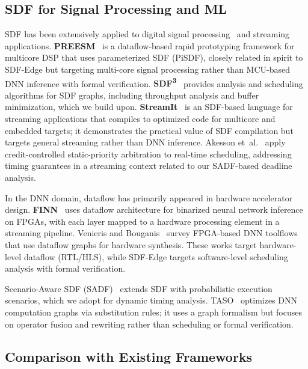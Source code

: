 \documentclass[journal]{IEEEtran}
\begin{document}
\subsection{SDF for Signal Processing and ML}

SDF has been extensively applied to digital signal processing~\cite{bhattacharyya1996software,stuijk2006sdf3} and streaming applications.
\textbf{PREESM}~\cite{pelcat2014preesm} is a dataflow-based rapid prototyping framework for multicore DSP that uses parameterized SDF (PiSDF), closely related in spirit to SDF-Edge but targeting multi-core signal processing rather than MCU-based DNN inference with formal verification.
\textbf{SDF\textsuperscript{3}}~\cite{stuijk2006sdf3} provides analysis and scheduling algorithms for SDF graphs, including throughput analysis and buffer minimization, which we build upon.
\textbf{StreamIt}~\cite{thies2002streamit} is an SDF-based language for streaming applications that compiles to optimized code for multicore and embedded targets; it demonstrates the practical value of SDF compilation but targets general streaming rather than DNN inference.
Akesson et~al.~\cite{siyoum2014resource} apply credit-controlled static-priority arbitration to real-time scheduling, addressing timing guarantees in a streaming context related to our SADF-based deadline analysis.

In the DNN domain, dataflow has primarily appeared in hardware accelerator design.
\textbf{FINN}~\cite{blott2018finn} uses dataflow architecture for binarized neural network inference on FPGAs, with each layer mapped to a hardware processing element in a streaming pipeline.
Venieris and Bouganis~\cite{venieris2018toolflows} survey FPGA-based DNN toolflows that use dataflow graphs for hardware synthesis.
These works target hardware-level dataflow (RTL/HLS), while SDF-Edge targets software-level scheduling analysis with formal verification.

Scenario-Aware SDF (SADF)~\cite{geilen2010sadf} extends SDF with probabilistic execution scenarios, which we adopt for dynamic timing analysis.
TASO~\cite{jia2019taso} optimizes DNN computation graphs via substitution rules; it uses a graph formalism but focuses on operator fusion and rewriting rather than scheduling or formal verification.

\subsection{Comparison with Existing Frameworks}
\end{document}
